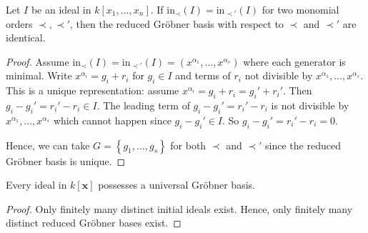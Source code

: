 \documentclass[a4paper, 11pt]{article}
\begin{document}
\begin{lemma}
  Let \( I \) be an ideal in \( k[x_1,...,x_n] \). If \( \mathrm{in}_{\prec}(I) = \mathrm{in}_{\prec'}(I) \) for two monomial orders \( \prec, \prec' \), then the reduced Gröbner basis with respect to \( \prec \) and \( \prec' \) are identical.
\end{lemma}

\begin{proof}  
  Assume \( \mathrm{in}_{\prec}(I) = \mathrm{in}_{\prec'}(I) = (x^{\alpha_1}, \dots,  x^{\alpha_s}) \) where each generator is minimal. Write \( x^{\alpha_i} = g_i + r_i \) for \( g_i \in I \) and terms of \( r_i \) not divisible by \(  x^{\alpha_1}, \dots,  x^{\alpha_s}\). This is a unique representation: assume \( x^{\alpha_i} = g_i + r_i = g_i' + r_i '\). Then \( g_i - g_i' = r_i' - r_i \in I \). The leading term of \( g_i - g_i ' = r_i' - r_i \) is not divisible by \( x^{\alpha_1}, \dots,  x^{\alpha_s} \) which cannot happen since \( g_i - g_i' \in I \). So \( g_i - g_i' = r_i' - r_i = 0 \).

   Hence, we can take \( G = \left\{ g_1, \dots, g_s \right\} \) for both \( \prec \) and \( \prec' \) since the reduced Gröbner basis is unique. 
\end{proof}

\begin{prop}
  Every ideal in \( k[\mathbf x] \) possesses a universal Gröbner basis.
\end{prop}


\begin{proof}
  Only finitely many distinct initial ideals exist. Hence, only finitely many distinct reduced Gröbner bases exist.
\end{proof}
\end{document}
